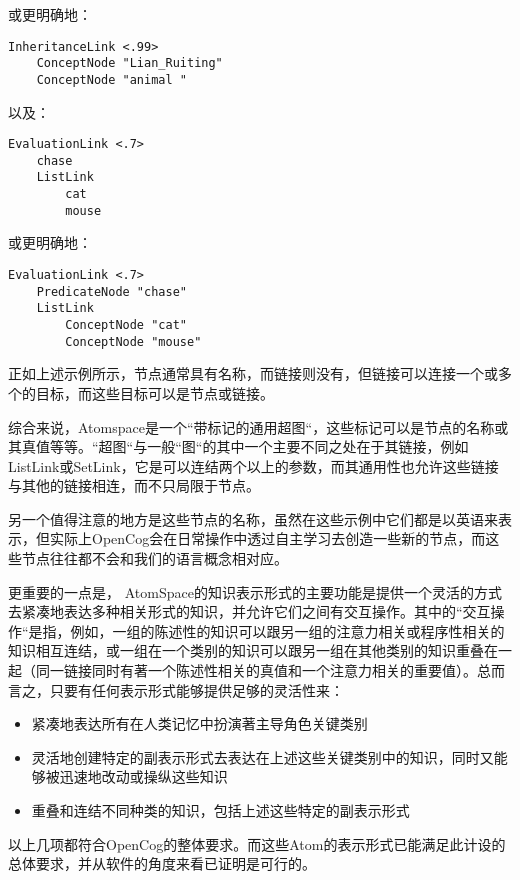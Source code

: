 \noindent 或更明确地：

 \begin{verbatim}
InheritanceLink <.99>
	ConceptNode "Lian_Ruiting"
	ConceptNode "animal "
\end{verbatim}

以及：

\begin{verbatim}
EvaluationLink <.7>
	chase 
	ListLink
		cat
		mouse
\end{verbatim}

\noindent 或更明确地：

\begin{verbatim}
EvaluationLink <.7>
	PredicateNode "chase" 
	ListLink
		ConceptNode "cat"
		ConceptNode "mouse"
\end{verbatim}

\noindent 正如上述示例所示，节点通常具有名称，而链接则没有，但链接可以连接一个或多个的目标，而这些目标可以是节点或链接。

综合来说，Atomspace是一个“带标记的通用超图“，这些标记可以是节点的名称或其真值等等。“超图“与一般“图“的其中一个主要不同之处在于其链接，例如ListLink或SetLink，它是可以连结两个以上的参数，而其通用性也允许这些链接与其他的链接相连，而不只局限于节点。

另一个值得注意的地方是这些节点的名称，虽然在这些示例中它们都是以英语来表示，但实际上OpenCog会在日常操作中透过自主学习去创造一些新的节点，而这些节点往往都不会和我们的语言概念相对应。

更重要的一点是， AtomSpace的知识表示形式的主要功能是提供一个灵活的方式去紧凑地表达多种相关形式的知识，并允许它们之间有交互操作。其中的“交互操作“是指，例如，一组的陈述性的知识可以跟另一组的注意力相关或程序性相关的知识相互连结，或一组在一个类别的知识可以跟另一组在其他类别的知识重叠在一起（同一链接同时有著一个陈述性相关的真值和一个注意力相关的重要值）。总而言之，只要有任何表示形式能够提供足够的灵活性来：

\begin{itemize}
\item 紧凑地表达所有在人类记忆中扮演著主导角色关键类别
\item 灵活地创建特定的副表示形式去表达在上述这些关键类别中的知识，同时又能够被迅速地改动或操纵这些知识
\item 重叠和连结不同种类的知识，包括上述这些特定的副表示形式
\end{itemize}

\noindent 以上几项都符合OpenCog的整体要求。而这些Atom的表示形式已能满足此计设的总体要求，并从软件的角度来看已证明是可行的。

